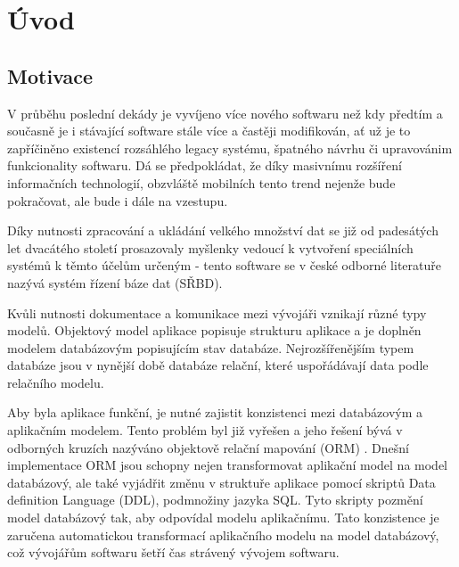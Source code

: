 \documentclass[11pt,twoside,a4paper]{book}
\begin{document}
\listoftables

\listofalgorithms


\mainbodystarts


% 
% 

\chapter{Úvod}\label{chapt:uvod}
\section{Motivace}

V průběhu poslední dekády je vyvíjeno více nového softwaru než kdy předtím a
současně je i stávající software stále více a častěji modifikován, ať už
je to zapříčiněno  existencí rozsáhlého legacy systému, špatného návrhu či
upravovánim funkcionality softwaru. Dá se předpokládat, že díky masivnímu
rozšíření informačních technologií, obzvláště mobilních tento trend nejenže bude
pokračovat, ale bude i dále na vzestupu.

Díky nutnosti zpracování a ukládání velkého množství dat se již od padesátých
let dvacátého století prosazovaly myšlenky vedoucí k vytvoření speciálních
systémů k těmto účelům určeným - tento software se v české odborné literatuře
nazývá systém řízení báze dat (SŘBD). 

Kvůli nutnosti dokumentace a komunikace mezi vývojáři vznikají různé typy
modelů. Objektový model aplikace popisuje strukturu aplikace a je doplněn 
modelem databázovým popisujícím stav databáze. Nejrozšířenějším typem
databáze jsou v nynější době databáze relační, které uspořádávají data podle
relačního modelu. 

Aby byla aplikace funkční, je nutné zajistit konzistenci mezi databázovým a
aplikačním modelem.
Tento problém byl již vyřešen a jeho řešení bývá v odborných kruzích nazýváno
objektově relační mapování (ORM) \cite{orm}. Dnešní implementace ORM jsou
schopny nejen transformovat aplikační model na model databázový, ale také
vyjádřit změnu v struktuře aplikace pomocí skriptů Data definition Language
(DDL), podmnožiny jazyka SQL.
Tyto skripty pozmění model databázový tak, aby odpovídal modelu aplikačnímu.
Tato konzistence je zaručena automatickou transformací aplikačního modelu na
model databázový, což vývojářům softwaru šetří čas strávený vývojem softwaru.
\end{document}
